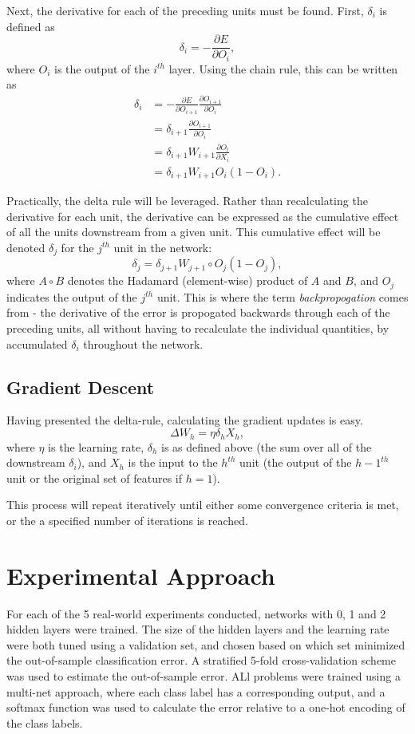 \documentclass{amsart}
\begin{document}
    Next, the derivative for each of the preceding units
    must be found. First, $\delta_i$ is defined as
    \[
        \delta_i = -\frac{\partial E}{\partial O_i},
    \]
    where $O_i$ is the output of the $i^{th}$ layer.
    Using the chain rule, this can be written as
    \begin{align*}
        \delta_i &= - \frac{\partial E}{\partial O_{i+1}}
        \frac{\partial O_{i+1}}{\partial O_{i}} \\
        &= \delta_{i+1}  \frac{\partial O_{i+1}}{\partial O_{i}} \\
        &= \delta_{i+1} W_{i+1} \frac{\partial O_i}{\partial X_i} \\
        &= \delta_{i+1} W_{i+1} O_i (1 - O_i).
    \end{align*}

    Practically, the delta rule will be leveraged.
    Rather than recalculating the derivative for each unit,
    the derivative can be expressed as the cumulative effect of
    all the units downstream from a given unit. This cumulative
    effect will be denoted $\delta_j$ for the $j^{th}$ unit in the network:
    \[
        \delta_j = \delta_{j+1} W_{j+1} \circ  O_j (1 - O_j),
    \]
    where $A \circ B$ denotes the Hadamard (element-wise) product of $A$ and $B$,
    and $O_j$ indicates the output of the $j^{th}$ unit. This is where
    the term \textit{backpropogation} comes from - the derivative of the error
    is propogated backwards through each of the preceding units, all without
    having to recalculate the individual quantities, by accumulated
    $\delta_i$ throughout the network.

    \subsection*{Gradient Descent}
    Having presented the delta-rule, calculating the gradient updates is easy.
    \[
        \Delta W_h = \eta \delta_h X_h,
    \]
    where $\eta$ is the learning rate, $\delta_h$ is as defined above (the sum
    over all of the downstream $\delta_i$), and $X_h$ is the input to the $h^{th}$
    unit (the output of the $h-1^{th}$ unit or the original set of features if
    $h=1$).

    This process will repeat iteratively until either some convergence criteria is
    met, or the a specified number of iterations is reached.

    \section{Experimental Approach}
    For each of the 5 real-world experiments conducted, networks with 0, 1 and 2 hidden
    layers were trained. The size of the hidden layers and the
    learning rate were both tuned using a validation set, and chosen based on which
    set minimized the out-of-sample classification error.
    A stratified 5-fold cross-validation scheme was used to estimate
    the out-of-sample error. ALl problems were trained using a multi-net approach, where each
    class label has a corresponding output, and a softmax function was used to calculate
    the error relative to a one-hot encoding of the class labels.
\end{document}
